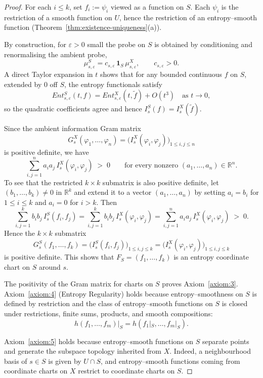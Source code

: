 \documentclass[11pt]{amsart}
\theoremstyle{definition}
\theoremstyle{remark}
\begin{document}
\begin{proof}
For each $i\le k$, set $f_i := \psi_i$ viewed as a function on $S$.  
Each $\psi_i$ is the restriction of a smooth function on $U$, hence the 
restriction of an entropy–smooth function (Theorem~\ref{thm:existence-uniqueness}(a)).  

By construction, for $\varepsilon>0$ small the probe on $S$ is obtained by
conditioning and renormalising the ambient probe,
\[
\mu^S_{s,\varepsilon} = c_{s,\varepsilon}\,\mathbf{1}_S\,\mu^X_{s,\varepsilon},
\qquad c_{s,\varepsilon}>0.
\]
A direct Taylor expansion in $t$ shows that for any bounded continuous
$f$ on $S$, extended by $0$ off $S$, the entropy functionals satisfy
\[
Ent^S_{s,\varepsilon}(t,f)
=
Ent^X_{s,\varepsilon}(t,\tilde f) + O(t^3)
\quad\text{as }t\to 0,
\]
so the quadratic coefficients agree and hence
$I^S_s(f) = I^X_s(\tilde f)$.

Since the ambient information Gram matrix
\[
G^{X}_{s}(\varphi_1,\dots,\varphi_n)
=
\bigl(I^X_s(\varphi_i,\varphi_j)\bigr)_{1\le i,j\le n}
\]
is positive definite, we have
\[
\sum_{i,j=1}^n a_i a_j\, I^X_s(\varphi_i,\varphi_j) \;>\; 0
\qquad\text{for every nonzero }(a_1,\dots,a_n)\in\mathbb{R}^n.
\]
To see that the restricted $k\times k$ submatrix is also positive definite,
let $(b_1,\dots,b_k)\neq 0$ in $\mathbb{R}^k$ and extend it to a vector
$(a_1,\dots,a_n)$ by setting $a_i=b_i$ for $1\le i\le k$ and $a_i=0$ for
$i>k$.  Then
\[
\sum_{i,j=1}^k b_i b_j\, I^S_s(f_i,f_j)
=
\sum_{i,j=1}^k b_i b_j\, I^X_s(\varphi_i,\varphi_j)
=
\sum_{i,j=1}^n a_i a_j\, I^X_s(\varphi_i,\varphi_j)
\;>\; 0.
\]
Hence the $k\times k$ submatrix
\[
G^{S}_{s}(f_1,\dots,f_k)
=
\bigl(I^S_s(f_i,f_j)\bigr)_{1\le i,j\le k}
=
\bigl(I^X_s(\varphi_i,\varphi_j)\bigr)_{1\le i,j\le k}
\]
is positive definite.  This shows that $F_S=(f_1,\dots,f_k)$ is an entropy
coordinate chart on $S$ around $s$.

The positivity of the Gram matrix for charts on $S$ proves Axiom~\ref{axiom:3}.  
Axiom~\ref{axiom:4} (Entropy Regularity) holds because entropy–smoothness on $S$ is 
defined by restriction and the class of entropy–smooth functions on $S$ is 
closed under restrictions, finite sums, products, and smooth compositions: 
\[
h(f_1,\dots,f_m)|_S = h(f_1|_S,\dots,f_m|_S).
\]

Axiom~\ref{axiom:5} holds because entropy–smooth functions on $S$ separate points and 
generate the subspace topology inherited from $X$.  
Indeed, a neighbourhood basis of $s\in S$ is given by $U\cap S$, and 
entropy–smooth functions coming from coordinate charts on $X$ restrict to 
coordinate charts on $S$.


\end{proof}
\end{document}
